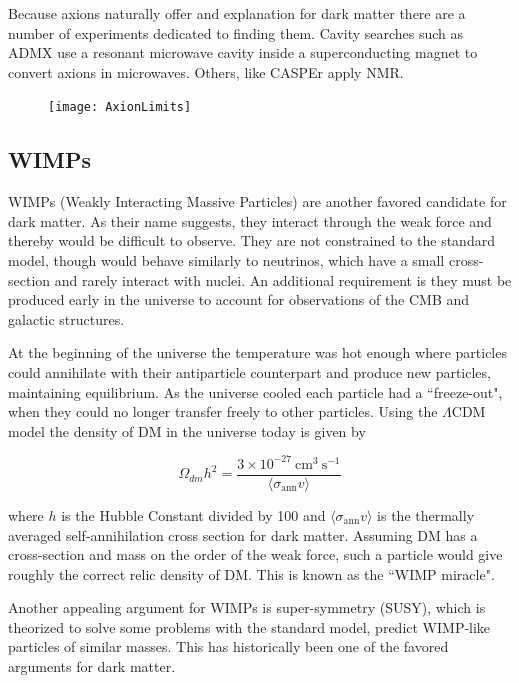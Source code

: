 Because axions naturally offer and explanation for dark matter there are a number of experiments dedicated to
finding them.  Cavity searches such as ADMX use a resonant microwave cavity inside a superconducting magnet
to convert axions in microwaves.  Others, like CASPEr apply NMR.

\begin{figure}
\centering
\texttt{[image: AxionLimits]}
\label{fig:axons}
\end{figure}


\subsection{WIMPs} \label{subsec:wimps}
WIMPs (Weakly Interacting Massive Particles) are another favored candidate for dark matter.  As their name
suggests, they interact through the weak force and thereby would be difficult to observe.  They
are not constrained to the standard model, though would behave similarly
to neutrinos, which have a small cross-section and rarely interact with nuclei.  An additional requirement
is they must be produced early in the universe to account for observations of the CMB and galactic
structures.

At the beginning of the universe the temperature was hot enough where particles could annihilate with their
antiparticle counterpart and produce new particles, maintaining equilibrium.  As the universe cooled each
particle had a ``freeze-out", when they could no longer transfer freely to other particles.  Using the
$\Lambda$CDM model the density of DM in the universe today is given by

\begin{equation}
\Omega_{dm}h^{2} = \frac{3 \times 10^{-27}\ \mathrm{cm^{3}\ s^{-1}}}{\langle \sigma_{\mathrm{ann}} v \rangle}
\end{equation}

\noindent where $h$ is the Hubble Constant divided by 100 and $\langle \sigma_{\mathrm{ann}} v \rangle$ is
the thermally averaged self-annihilation cross section
for dark matter.  Assuming DM has a cross-section and mass on the order of the weak force, such a
particle would give roughly the correct relic density of DM.  This is known as the ``WIMP miracle".

Another appealing argument for WIMPs is super-symmetry (SUSY), which is theorized to solve some problems
with the standard model,
predict WIMP-like particles of similar masses.  This has historically been one of the favored arguments
for dark matter.


